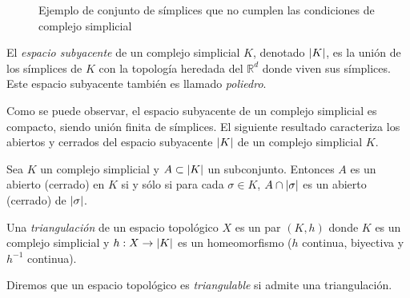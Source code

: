 \begin{figure}[ht]
\centering
{}
\caption{Ejemplo de conjunto de símplices que no cumplen las condiciones de complejo simplicial}
\label{ref:noComp}
\end{figure}

\begin{definition}
El \emph{espacio subyacente} de un complejo simplicial $K$, denotado $\lvert K\rvert$, es la unión de los símplices de $K$ con la topología heredada del $\mathbb{R}^d$ donde viven sus símplices. Este espacio subyacente también es llamado \emph{poliedro}.
\end{definition}
Como se puede observar, el espacio subyacente  de un complejo simplicial es compacto, siendo unión finita de símplices. El siguiente resultado caracteriza los abiertos y cerrados del espacio subyacente $\lvert K\rvert$ de un complejo simplicial $K$.

\begin{proposition}
Sea $K$ un complejo simplicial y $A \subset \lvert K\rvert$ un subconjunto. Entonces $A$ es un abierto (cerrado) en $K$ si y sólo si para cada $\sigma \in K$, $A \cap \lvert\sigma\rvert$ es un abierto (cerrado) de $\lvert\sigma\rvert$.
\end{proposition}

\begin{definition}
Una \emph{triangulación} de un espacio topológico $X$ es un par $(K, h)$ donde $K$ es un complejo simplicial y $h: X \to \lvert K\rvert$ es un homeomorfismo ($h$ continua, biyectiva y $h^{-1}$ continua).
\end{definition}
Diremos que un espacio topológico es \emph{triangulable} si admite una triangulación.


